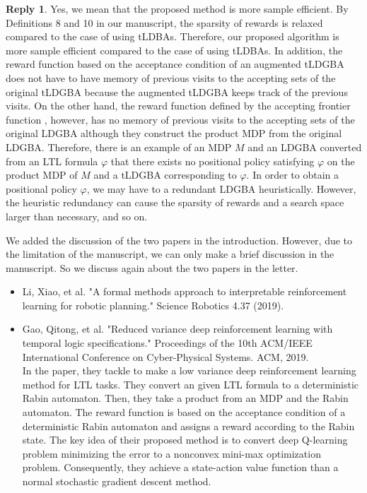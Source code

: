 \documentclass[10 pt, dvipdfmx]{article}
\theoremstyle{definition}
\newtheorem{review point}{Review Point}[section]
\newtheorem*{reply}{Reply}
\begin{document}
\begin{reply}
  Yes, we mean that the proposed method is more sample efficient. By Definitions 8 and 10 in our manuscript, the sparsity of rewards is relaxed compared to the case of using tLDBAs. Therefore, our proposed algorithm is more sample efficient compared to the case of using tLDBAs. In addition, the reward function based on the acceptance condition of an augmented tLDGBA does not have to have memory of previous visits to the accepting sets of the original tLDGBA because the augmented tLDGBA keeps track of the previous visits. On the other hand, the reward function defined by the accepting frontier function \cite{HAK2019}, however, has no memory of previous visits to the accepting sets of the original LDGBA although they construct the product MDP from the original LDGBA. Therefore, there is an example of an MDP $M$ and an LDGBA converted from an LTL formula $\varphi$ that there exists no positional policy satisfying $\varphi$ on the product MDP of $M$ and a tLDGBA corresponding to $\varphi$. In order to obtain a positional policy $\varphi$, we may have to a redundant LDGBA heuristically. However, the heuristic redundancy can cause the sparsity of rewards and a search space larger than necessary, and so on.


  We added the discussion of the two papers in the introduction. However, due to the limitation of the manuscript, we can only make a brief discussion in the manuscript. So we discuss again about the two papers in the letter.

  \begin{itemize}
   \item Li, Xiao, et al. "A formal methods approach to interpretable reinforcement learning for robotic planning." Science Robotics 4.37 (2019). \\

   \item Gao, Qitong, et al. "Reduced variance deep reinforcement learning with temporal logic specifications." Proceedings of the 10th ACM/IEEE International Conference on Cyber-Physical Systems. ACM, 2019. \\

   In the paper, they tackle to make a low variance deep reinforcement learning method for LTL tasks. They convert an given LTL formula to a deterministic Rabin automaton. Then, they take a product from an MDP and the Rabin automaton. The reward function is based on the acceptance condition of a deterministic Rabin automaton and assigns a reward according to the Rabin state. The key idea of their proposed method is to convert deep Q-learning problem minimizing the error to a nonconvex mini-max optimization problem. Consequently, they achieve a state-action value function than a normal stochastic gradient descent method.
  \end{itemize}
\end{reply}
\end{document}
